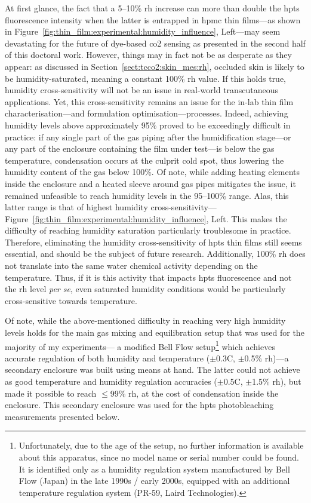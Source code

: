 At first glance, the fact that a 5--10\% \gls{rh} increase can more than double the \gls{hpts} fluorescence intensity when the latter is entrapped in \gls{hpmc} thin films---as shown in Figure~\ref{fig:thin_film:experimental:humidity_influence}, Left---may seem devastating for the future of dye-based \gls{co2} sensing as presented in the second half of this doctoral work. However, things may in fact not be as desperate as they appear: as discussed in Section~\ref{sect:tcco2:skin_mes:rh}, occluded skin is likely to be humidity-saturated, meaning a constant 100\% \gls{rh} value. If this holds true, humidity cross-sensitivity will not be an issue in real-world transcutaneous applications. Yet, this cross-sensitivity remains an issue for the in-lab thin film characterisation---and formulation optimisation---processes. Indeed, achieving humidity levels above approximately 95\% proved to be exceedingly difficult in practice: if any single part of the gas piping after the humidification stage---or any part of the enclosure containing the film under test---is below the gas temperature, condensation occurs at the culprit cold spot, thus lowering the humidity content of the gas below 100\%. Of note, while adding heating elements inside the enclosure and a heated sleeve around gas pipes mitigates the issue, it remained unfeasible to reach humidity levels in the 95--100\% range. Alas, this latter range is that of highest humidity cross-sensitivity---Figure~\ref{fig:thin_film:experimental:humidity_influence}, Left. This makes the difficulty of reaching humidity saturation particularly troublesome in practice. \mfrin{}Therefore, eliminating the humidity cross-sensitivity of \gls{hpts} thin films still seems essential, and should be the subject of future research. Additionally, 100\% \gls{rh} does not translate into the same water chemical activity depending on the temperature\cite{huang2018}. Thus, if it is this activity that impacts \gls{hpts} fluorescence and not the \gls{rh} level \textit{per se}, even saturated humidity conditions would be particularly cross-sensitive towards temperature.

Of note, while the above-mentioned difficulty in reaching very high humidity levels holds for the main gas mixing and equilibration setup that was used for the majority of my experiments---\ie{} a modified Bell Flow setup\footnote{Unfortunately, due to the age of the setup, no further information is available about this apparatus, since no model name or serial number could be found. It is identified only as a humidity regulation system manufactured by Bell Flow (Japan) in the late 1990s / early 2000s, equipped with an additional temperature regulation system (PR-59, Laird Technologies).} which achieves accurate regulation of both humidity and temperature ($\pm$0.3{\degree}C, $\pm$0.5\% \gls{rh})---a secondary enclosure was built using means at hand. The latter could not achieve as good temperature and humidity regulation accuracies ($\pm$0.5{\degree}C, $\pm$1.5\% \gls{rh}), but made it possible to reach $\leq$99\% \gls{rh}, at the cost of condensation inside the enclosure. This secondary enclosure was used for the \gls{hpts} photobleaching measurements presented below.


